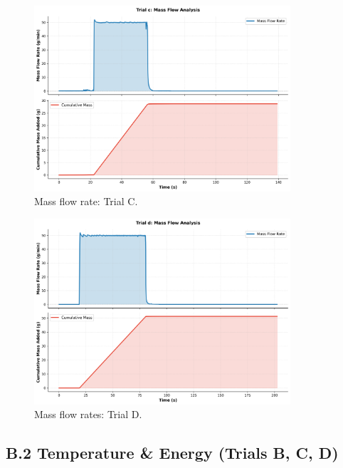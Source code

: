 \documentclass[12pt]{article}
\begin{document}
\begin{figure}[H]
\centering
\includegraphics[width=0.85\textwidth]{graphs/part1_trial_c_mass_flow.png}
\caption{Mass flow rate: Trial C.}
\end{figure}

\begin{figure}[H]
\centering
\includegraphics[width=0.85\textwidth]{graphs/part1_trial_d_mass_flow.png}
\caption{Mass flow rates: Trial D.}
\end{figure}

\subsection*{B.2 Temperature \& Energy (Trials B, C, D)}
\end{document}
